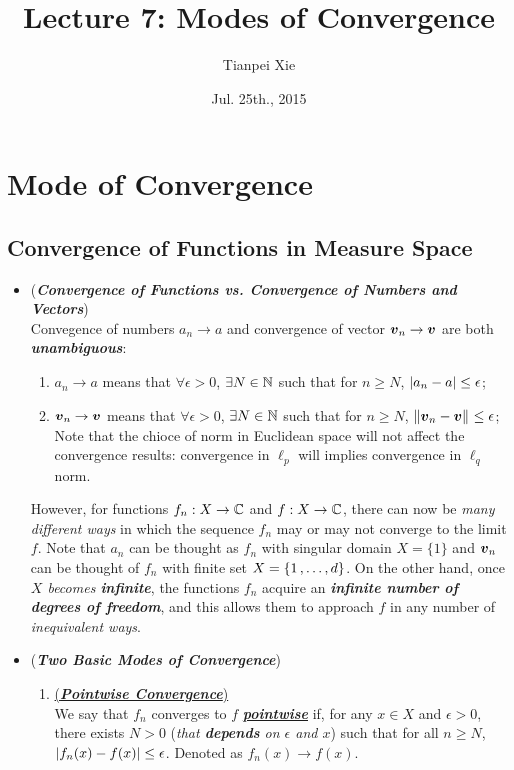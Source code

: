 \documentclass[11pt]{article}
\begin{document}
\title{Lecture 7: Modes of Convergence}
\author{ Tianpei Xie}
\date{ Jul. 25th., 2015 }
\maketitle
\tableofcontents
\newpage
\section{Mode of Convergence}
\subsection{Convergence of Functions in Measure Space}
\begin{itemize}
\item \begin{remark} (\emph{\textbf{Convergence of Functions vs. Convergence of Numbers and Vectors}})  \\
Convegence of numbers $a_n \rightarrow a$ and convergence of vector $\boldsymbol{v}_n \rightarrow \boldsymbol{v}$ are both \emph{\textbf{unambiguous}}:
\begin{enumerate}
\item $a_n \rightarrow a$ means that $\forall \epsilon > 0$, $\exists N \in {\mathbb N}$ such that for $n \ge N$, $\left\lvert a_n - a \right\rvert \le \epsilon$;
\item $\boldsymbol{v}_n \rightarrow \boldsymbol{v}$ means that $\forall \epsilon > 0$, $\exists N \in {\mathbb N}$ such that for $n \ge N$, $\left\|\boldsymbol{v}_n - \boldsymbol{v}\right\|_{} \le \epsilon$; Note that the chioce of norm in Euclidean space will not affect the convergence results: convergence in $\ell_{p}$ will implies convergence in $\ell_{q}$ norm. 
\end{enumerate}

However, for functions $f_n: X \rightarrow {\mathbb C}$ and $f: X \rightarrow {\mathbb C}$, there can now be \emph{many different ways} in which the sequence $f_n$ may or may not converge to the limit $f$. Note that $a_n$ can be thought as $f_n$ with singular domain $X= \{1\}$ and $\boldsymbol{v}_n$ can be thought of $f_n$ with finite set $X = \left\{1 \,{,}\ldots{,}\, d\right\}$. On the other hand, once \emph{$X$ becomes \textbf{infinite}}, the functions $f_n$ acquire an \emph{\textbf{infinite number of degrees of freedom}}, and this allows them to approach $f$ in any number of \emph{inequivalent ways}.
\end{remark}

\item \begin{remark} (\emph{\textbf{Two Basic Modes of Convergence}}) \citep{royden1988real, tao2011introduction}
\begin{enumerate}
\item \begin{definition}  \underline{(\emph{\textbf{Pointwise Convergence}})}\\
We say that $f_n$ converges to $f$ \underline{\emph{\textbf{pointwise}}} if, for any $x\in X$ and $\epsilon > 0$, there exists $N > 0$ (\emph{that \textbf{depends} on $\epsilon$ and $x$}) such that for all $n \ge N$, $\left\lvert f_n(x) - f(x) \right\rvert \le  \epsilon$. Denoted as $f_{n}(x)\rightarrow f(x)$.
\end{definition}


\end{enumerate}
\end{remark}
\end{itemize}
\end{document}
